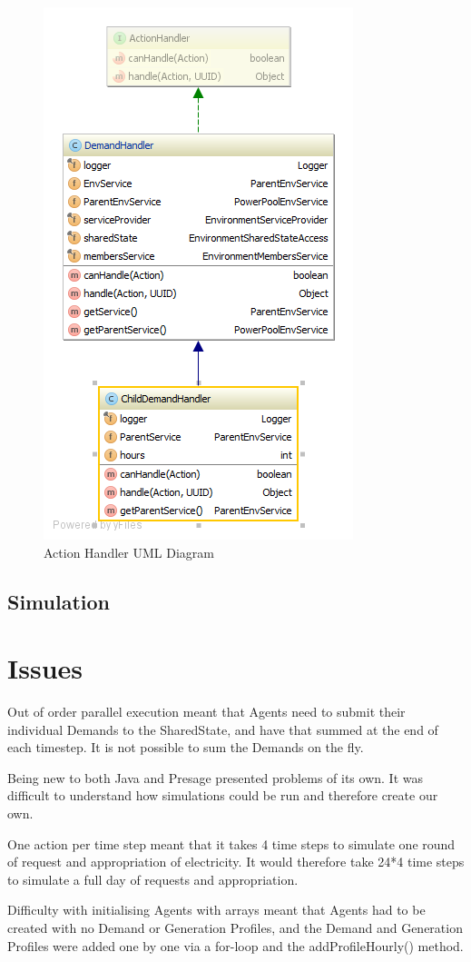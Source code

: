 \begin{figure}[!h]
	\centering
	\includegraphics[scale=0.4]{Images/ActionHandlerUML.png}
	\caption{Action Handler UML Diagram}
	\label{fig:ActionHandlerUML}
\end{figure}

\subsection*{Simulation}


\section*{Issues}
Out of order parallel execution meant that Agents need to submit their individual Demands to the SharedState, and have that summed at the end of each timestep. It is not possible to sum the Demands on the fly.

Being new to both Java and Presage presented problems of its own. It was difficult to understand how simulations could be run and therefore create our own.

One action per time step meant that it takes 4 time steps to simulate one round of request and appropriation of electricity. It would therefore take 24*4 time steps to simulate a full day of requests and appropriation.

Difficulty with initialising Agents with arrays meant that Agents had to be created with no Demand or Generation Profiles, and the Demand and Generation Profiles were added one by one via a for-loop and the addProfileHourly() method.


